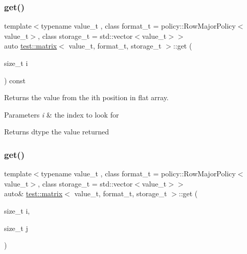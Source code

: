 \subsubsection{\texorpdfstring{get()}{get()}\hspace{0.1cm}{\footnotesize\ttfamily [2/4]}}
{\footnotesize\ttfamily template$<$typename value\+\_\+t , class format\+\_\+t  = policy\+::\+Row\+Major\+Policy$<$value\+\_\+t$>$, class storage\+\_\+t  = std\+::vector$<$value\+\_\+t$>$$>$ \\
auto \mbox{\hyperlink{classtest_1_1matrix}{test\+::matrix}}$<$ value\+\_\+t, format\+\_\+t, storage\+\_\+t $>$\+::get (\begin{DoxyParamCaption}\item[{size\+\_\+t}]{i }\end{DoxyParamCaption}) const\hspace{0.3cm}{\ttfamily [inline]}}



Returns the value from the ith position in flat array. 


\begin{DoxyParams}{Parameters}
{\em i} & the index to look for \\
\hline
\end{DoxyParams}
\begin{DoxyReturn}{Returns}
dtype the value returned 
\end{DoxyReturn}
\mbox{\label{classtest_1_1matrix_ad101d663d9026d4a09aeae44350f4842}} 
\subsubsection{\texorpdfstring{get()}{get()}\hspace{0.1cm}{\footnotesize\ttfamily [3/4]}}
{\footnotesize\ttfamily template$<$typename value\+\_\+t , class format\+\_\+t  = policy\+::\+Row\+Major\+Policy$<$value\+\_\+t$>$, class storage\+\_\+t  = std\+::vector$<$value\+\_\+t$>$$>$ \\
auto\& \mbox{\hyperlink{classtest_1_1matrix}{test\+::matrix}}$<$ value\+\_\+t, format\+\_\+t, storage\+\_\+t $>$\+::get (\begin{DoxyParamCaption}\item[{size\+\_\+t}]{i,  }\item[{size\+\_\+t}]{j }\end{DoxyParamCaption})\hspace{0.3cm}{\ttfamily [inline]}}




